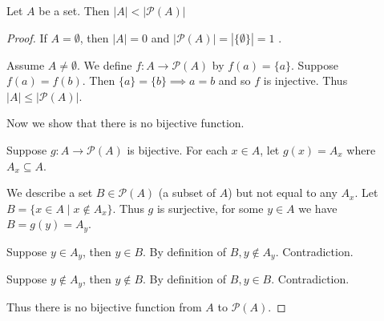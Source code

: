 \documentclass{article}
\begin{document}
    \begin{theorem}
      Let $A$ be a set. Then $|A| < |\mathcal{P}(A)|$
    \end{theorem}
    \begin{proof}
      If $A = \emptyset$, then $|A| = 0$ and $|\mathcal{P}(A)| = |\{\emptyset\}| = 1$ .

      Assume $A \neq \emptyset$. We define $f: A \to \mathcal{P}(A)$ by $f(a) = \{a\}$.
      Suppose $f(a) = f(b)$. Then $\{a\} = \{b\} \implies a = b$ and so $f$ is injective. Thus $|A| \leq |\mathcal{P}(A)|$.

      Now we show that there is no bijective function.

      Suppose $g: A \to \mathcal{P}(A)$ is bijective. For each $x \in A$, let $g(x) = A_x$ where $A_x \subseteq A$.

      We describe a set $B \in \mathcal{P}(A)$ (a subset of $A$) but not equal to any $A_x$. Let $B = \{x \in A \mid x \not \in A_x\}$. Thus $g$ is surjective, for some $y \in A$ we have $B = g(y) = A_y$.

      Suppose $y \in A_y$, then $y \in B$. By definition of $B, y \not \in A_y$. Contradiction.

      Suppose $y \not\in A_y$, then $y \not \in B$. By definition of $B, y \in B$. Contradiction.

      Thus there is no bijective function from $A$ to $\mathcal{P}(A)$.
    \end{proof}
    
\end{document}
